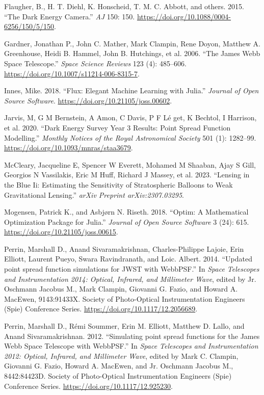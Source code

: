 \documentclass[
]{article}
\newlength{\cslhangindent}
\newenvironment{cslreferences}%
  {\setlength{\parindent}{0pt}%
  \everypar{\setlength{\hangindent}{\cslhangindent}}\ignorespaces}%
  {\par}
\begin{document}
\begin{cslreferences}
\leavevmode\hypertarget{ref-2015AJ}{}%
Flaugher, B., H. T. Diehl, K. Honscheid, T. M. C. Abbott, and others.
2015. ``The Dark Energy Camera.'' \emph{AJ} 150: 150.
\url{https://doi.org/10.1088/0004-6256/150/5/150}.

\leavevmode\hypertarget{ref-Gardner_2006}{}%
Gardner, Jonathan P., John C. Mather, Mark Clampin, Rene Doyon, Matthew
A. Greenhouse, Heidi B. Hammel, John B. Hutchings, et al. 2006. ``The
James Webb Space Telescope.'' \emph{Space Science Reviews} 123 (4):
485--606. \url{https://doi.org/10.1007/s11214-006-8315-7}.

\leavevmode\hypertarget{ref-innes:2018}{}%
Innes, Mike. 2018. ``Flux: Elegant Machine Learning with Julia.''
\emph{Journal of Open Source Software}.
\url{https://doi.org/10.21105/joss.00602}.

\leavevmode\hypertarget{ref-Jarvis_2020}{}%
Jarvis, M, G M Bernstein, A Amon, C Davis, P F Lé get, K Bechtol, I
Harrison, et al. 2020. ``Dark Energy Survey Year 3 Results: Point Spread
Function Modelling.'' \emph{Monthly Notices of the Royal Astronomical
Society} 501 (1): 1282--99.
\url{https://doi.org/10.1093/mnras/staa3679}.

\leavevmode\hypertarget{ref-mccleary2023lensing}{}%
McCleary, Jacqueline E, Spencer W Everett, Mohamed M Shaaban, Ajay S
Gill, Georgios N Vassilakis, Eric M Huff, Richard J Massey, et al. 2023.
``Lensing in the Blue Ii: Estimating the Sensitivity of Stratospheric
Balloons to Weak Gravitational Lensing.'' \emph{arXiv Preprint
arXiv:2307.03295}.

\leavevmode\hypertarget{ref-Mogensen2018}{}%
Mogensen, Patrick K., and Asbjørn N. Riseth. 2018. ``Optim: A
Mathematical Optimization Package for Julia.'' \emph{Journal of Open
Source Software} 3 (24): 615. \url{https://doi.org/10.21105/joss.00615}.

\leavevmode\hypertarget{ref-2014SPIE}{}%
Perrin, Marshall D., Anand Sivaramakrishnan, Charles-Philippe Lajoie,
Erin Elliott, Laurent Pueyo, Swara Ravindranath, and Loic. Albert. 2014.
``Updated point spread function simulations for JWST with WebbPSF.'' In
\emph{Space Telescopes and Instrumentation 2014: Optical, Infrared, and
Millimeter Wave}, edited by Jr. Oschmann Jacobus M., Mark Clampin,
Giovanni G. Fazio, and Howard A. MacEwen, 9143:91433X. Society of
Photo-Optical Instrumentation Engineers (Spie) Conference Series.
\url{https://doi.org/10.1117/12.2056689}.

\leavevmode\hypertarget{ref-2012SPIE}{}%
Perrin, Marshall D., Rémi Soummer, Erin M. Elliott, Matthew D. Lallo,
and Anand Sivaramakrishnan. 2012. ``Simulating point spread functions
for the James Webb Space Telescope with WebbPSF.'' In \emph{Space
Telescopes and Instrumentation 2012: Optical, Infrared, and Millimeter
Wave}, edited by Mark C. Clampin, Giovanni G. Fazio, Howard A. MacEwen,
and Jr. Oschmann Jacobus M., 8442:84423D. Society of Photo-Optical
Instrumentation Engineers (Spie) Conference Series.
\url{https://doi.org/10.1117/12.925230}.


\end{cslreferences}
\end{document}
